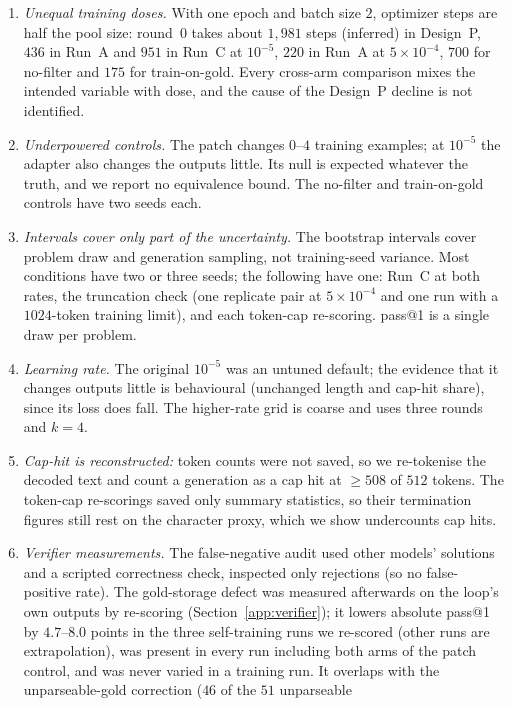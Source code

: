 \documentclass[runningheads]{llncs}
\begin{document}
\begin{enumerate}
\item \emph{Unequal training doses.} With one epoch and batch size $2$, optimizer
steps are half the pool size: round~0 takes about $1{,}981$ steps (inferred) in
Design~P, $436$ in Run~A and $951$ in Run~C at $10^{-5}$, $220$ in Run~A at
$5\times10^{-4}$, $700$ for no-filter and $175$ for train-on-gold. Every
cross-arm comparison mixes the intended variable with dose, and the cause of the
Design~P decline is not identified.
\item \emph{Underpowered controls.} The patch changes $0$--$4$ training examples;
at $10^{-5}$ the adapter also changes the outputs little. Its null is expected
whatever the truth, and we report no equivalence bound. The no-filter and
train-on-gold controls have two seeds each.
\item \emph{Intervals cover only part of the uncertainty.} The bootstrap
intervals cover problem draw and generation sampling, not training-seed
variance. Most conditions have two or three seeds; the following have one:
Run~C at both rates, the truncation check (one replicate pair at
$5\times10^{-4}$ and one run with a $1024$-token training limit), and each
token-cap re-scoring. pass@1 is a single draw per problem.
\item \emph{Learning rate.} The original $10^{-5}$ was an untuned default; the
evidence that it changes outputs little is behavioural (unchanged length and
cap-hit share), since its loss does fall. The higher-rate grid is coarse and
uses three rounds and $k=4$.
\item \emph{Cap-hit is reconstructed:} token counts were not saved, so we
re-tokenise the decoded text and count a generation as a cap hit at $\ge508$ of
$512$ tokens. The token-cap re-scorings saved only summary statistics, so
their termination figures still rest on the character proxy, which we
show undercounts cap hits.
\item \emph{Verifier measurements.} The false-negative audit used other models'
solutions and a scripted correctness check, inspected only rejections (so no
false-positive rate). The gold-storage defect was measured afterwards on the
loop's own outputs by re-scoring (Section~\ref{app:verifier}); it lowers
absolute pass@1 by $4.7$--$8.0$ points in the three self-training runs we
re-scored (other runs are extrapolation), was present in every run including
both arms of the patch control, and was never varied in a training run. It
overlaps with the unparseable-gold correction ($46$ of the $51$ unparseable

\end{enumerate}
\end{document}
